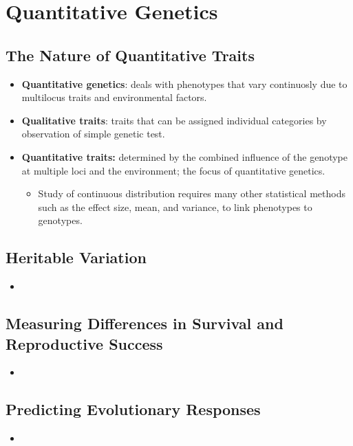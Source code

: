 \documentclass[12pt,a4paper]{article}
\begin{document}
\clearpage
\section{Quantitative Genetics}
\subsection{The Nature of Quantitative Traits}
\begin{itemize}
    \item \textbf{Quantitative genetics}: deals with phenotypes that vary continuosly due to multilocus traits and environmental factors.
    \item \textbf{Qualitative traits}: traits that can be assigned individual categories by observation of simple genetic test.
    \item \textbf{Quantitative traits:} determined by the combined influence of the genotype at multiple loci and the environment; the focus of quantitative genetics.
        \begin{itemize}
            \item Study of continuous distribution requires many other statistical methods such as the effect size, mean, and variance, to link phenotypes to genotypes.
        \end{itemize}
\end{itemize}

\subsection{Heritable Variation}
\begin{itemize}
    \item 
\end{itemize}

\subsection{Measuring Differences in Survival and Reproductive Success}
\begin{itemize}
    \item 
\end{itemize}

\subsection{Predicting Evolutionary Responses}
\begin{itemize}
    \item 
\end{itemize}
\end{document}
